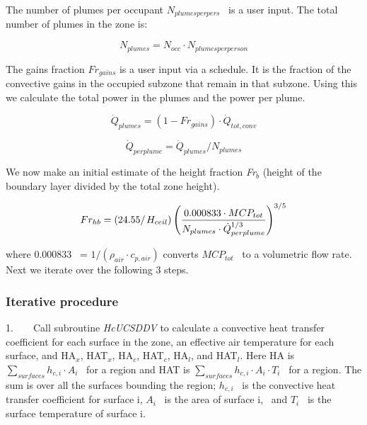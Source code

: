 The number of plumes per occupant \({N_{plumesperpers}}\) ~is a user input. The total number of plumes in the zone is:

\begin{equation}
{N_{plumes}} = {N_{occ}} \cdot {N_{plumesperperson}}
\end{equation}

The gains fraction \(F{r_{gains}}\) is a user input via a schedule. It is the fraction of the convective gains in the occupied subzone that remain in that subzone. Using this we calculate the total power in the plumes and the power per plume.

\begin{equation}
{\dot Q_{plumes}} = (1 - F{r_{gains}}) \cdot {\dot Q_{tot,conv}}
\end{equation}

\begin{equation}
{\dot Q_{perplume}} = {\dot Q_{plumes}}/{N_{plumes}}
\end{equation}

We now make an initial estimate of the height fraction \emph{Fr\(_{b}\)} (height of the boundary layer divided by the total zone height).

\begin{equation}
F{r_{hb}} = \left( {{{24.55} \mathord{\left/ {\vphantom {{24.55} {{H_{ceil}}}}} \right. } {{H_{ceil}}}}} \right){\left( {\frac{{0.000833 \cdot MC{P_{tot}}}}{{{N_{plumes}} \cdot \dot Q_{perplume}^{1/3}}}} \right)^{3/5}}
\end{equation}

where 0.000833~ = \(1/({\rho_{air}} \cdot {c_{p,air}})\) converts \(MC{P_{tot}}\) ~to a volumetric flow rate. Next we iterate over the following 3 steps.

\subsubsection{Iterative procedure}\label{iterative-procedure}

1.~~~~Call subroutine \emph{HcUCSDDV} to calculate a convective heat transfer coefficient for each surface in the zone, an effective air temperature for each surface, and HA\(_{x}\), HAT\(_{x}\), HA\(_{c}\), HAT\(_{c}\), HA\(_{l}\), and HAT\(_{l}\). Here HA is \(\sum\limits_{surfaces} {{h_{c,i}}} \cdot {A_i}\) ~for a region and HAT is \(\sum\limits_{surfaces} {{h_{c,i}}} \cdot {A_i} \cdot {T_i}\) ~for a region. The sum is over all the surfaces bounding the region; \({h_{c,i}}\) ~is the convective heat transfer coefficient for surface i, \({A_i}\) ~is the area of surface i,~ and \({T_i}\) ~is the surface temperature of surface i.

